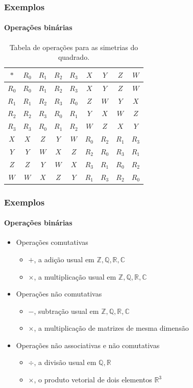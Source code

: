 \documentclass[12pt]{beamer}
\begin{document}
\begin{frame}
  \frametitle{Exemplos}
  \framesubtitle{Operações binárias}
  \begin{table}
    \begin{tabular}{c|cccccccc}
      $*$ & $R_{0}$ & $R_{1}$ & $R_{2}$ & $R_{3}$ & $X$ & $Y$ & $Z$ & $W$ \\
        \hline
      $R_{0}$ & $R_{0}$ & $R_{1}$ & $R_{2}$ & $R_{3}$ & $X$ & $Y$ & $Z$ & $W$
        \\
      $R_{1}$ & $R_{1}$ & $R_{2}$ & $R_{3}$ & $R_{0}$ & $Z$ & $W$ & $Y$ & $X$
        \\
      $R_{2}$ & $R_{2}$ & $R_{3}$ & $R_{0}$ & $R_{1}$ & $Y$ & $X$ & $W$ & $Z$
        \\
      $R_{3}$ & $R_{3}$ & $R_{0}$ & $R_{1}$ & $R_{2}$ & $W$ & $Z$ & $X$ & $Y$
        \\
      $X$ & $X$ & $Z$ & $Y$ & $W$ & $R_{0}$ & $R_{2}$ & $R_{1}$ & $R_{3}$ \\
      $Y$ & $Y$ & $W$ & $X$ & $Z$ & $R_{2}$ & $R_{0}$ & $R_{3}$ & $R_{1}$ \\
      $Z$ & $Z$ & $Y$ & $W$ & $X$ & $R_{3}$ & $R_{1}$ & $R_{0}$ & $R_{2}$ \\
      $W$ & $W$ & $X$ & $Z$ & $Y$ & $R_{1}$ & $R_{3}$ & $R_{2}$ & $R_{0}$ \\
    \end{tabular}
    \caption*{Tabela de operações para as simetrias do quadrado.}
  \end{table}
\end{frame}

\begin{frame}
  \frametitle{Exemplos}
  \framesubtitle{Operações binárias}
  \begin{itemize}
    \item<1-> Operações comutativas
    \begin{itemize}[itemsep=0pt]
      \item<2-> $+$, a adição usual em $\mathbb{Z}, \mathbb{Q}, \mathbb{R},
          \mathbb{C}$
      \item<3-> $\times$, a multiplicação usual em $\mathbb{Z}, \mathbb{Q},
          \mathbb{R}, \mathbb{C}$
    \end{itemize}
    \item<1-> Operações não comutativas
    \begin{itemize}[itemsep=0pt]
      \item<4-> $-$, subtração usual em $\mathbb{Z}, \mathbb{Q}, \mathbb{R},
          \mathbb{C}$
      \item<5-> $\times$, a multiplicação de matrizes de mesma dimensão
    \end{itemize}
    \item<1-> Operações não associativas e não comutativas
    \begin{itemize}[itemsep=0pt]
      \item<6-> $\div$, a divisão usual em $\mathbb{Q}, \mathbb{R}$
      \item<7-> $\times$, o produto vetorial de dois elementos $\mathbb{R}^{3}$
    \end{itemize}
  \end{itemize}
\end{frame}
\end{document}
